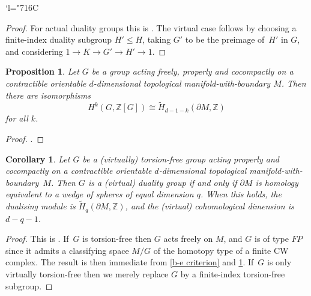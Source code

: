 \documentclass[JEP,XML,SOM,Unicode,NoFloatCountersInSection,published]{cedram}
\newcommand{\Changelback}{\mathcode`l="716C}
\theoremstyle{plain}
\newtheorem{prop}[thm]{Proposition}
\newtheorem{cor}[thm]{Corollary}
\theoremstyle{definition}
\newcommand{\Z}{\mathbb Z}
\begin{document}
\Changelback

\begin{proof}For actual duality groups this is \cite[Th.\,3.5]{be}. The virtual case follows by choosing a finite-index duality subgroup $H' \leq H$, taking $G'$ to be the preimage of~$H'$ in $G$, and considering $1 \to K \to G' \to H' \to 1$.
\end{proof}

\begin{prop}\label{action}
Let $G$ be a group acting freely, properly and cocompactly on a contractible orientable $d$-dimensional topological manifold-with-boundary $M$. Then there are isomorphisms
\[
H^k(G,\Z[G]) \cong \widetilde H_{d-1-k}(\partial M,\Z)
\]
for all $k$.
\end{prop}

\begin{proof}
\cite[\S 6.4]{be}.
\end{proof}

\begin{cor}\label{criterion}
Let $G$ be a (virtually) torsion-free group acting properly and cocompactly on a contractible orientable $d$-dimensional topological manifold-with-boundary~$M$. Then $G$ is a (virtual) duality group if and only if $\partial M$ is homology equivalent to a wedge of spheres of equal dimension $q$. When this holds, the dualising module is $\widetilde H_q(\partial M,\Z)$, and the (virtual) cohomological dimension is $d-q-1$.
\end{cor}

\begin{proof}This is \cite[Th.\,6.2]{be}. If~$G$ is torsion-free then $G$ acts freely on $M$, and $G$ is of type $\mathit{FP}$ since it admits a classifying space $M/G$ of the homotopy type of a finite CW complex. The result is then immediate from \cref{b-e criterion} and \cref{action}. If~$G$ is only virtually torsion-free then we merely replace $G$ by a finite-index torsion-free subgroup.
\end{proof}
\end{document}
